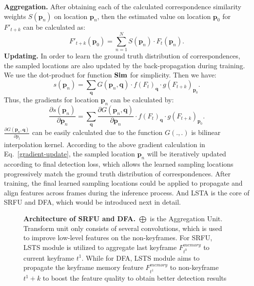 \documentclass[runningheads]{llncs}
\begin{document}
\noindent \textbf{Aggregation.}
After obtaining each of the calculated correspondence similarity weights $S(\mathbf{p}_n)$ on location $\mathbf{p}_n$, then the estimated value on location $\mathbf{p}_0$ for $F'_{t+k}$ can be calculated as:
\begin{equation}
    F'_{t+k}(\mathbf{p}_0) = \sum_{n=1}^{N} S(\mathbf{p}_n) \cdot F_t(\mathbf{p}_n).
\end{equation}
\noindent \textbf{Updating.}
In order to learn the ground truth distribution of correspondences, the sampled locations are also updated by the back-propagation during training.
We use the dot-product for function ${\rm \mathbf{Sim}}$ for simplicity.
Then we have:
\begin{equation}
s(\mathbf{p}_n) = \sum_{\mathbf{q}} G(\mathbf{p}_n,\mathbf{q}) \cdot f(F_{t})_{\mathbf{q}} \cdot g(F_{t+k})_{\mathbf{p}_0}.
\end{equation}
Thus, the gradients for location $\mathbf{p}_n$ can be calculated by:
\begin{equation}
\frac{\partial s(\mathbf{p}_n)}{ \partial \mathbf{p}_n} = \sum_{\mathbf{q}} \frac{\partial G(\mathbf{p}_n, \mathbf{q})}{\partial \mathbf{p}_n} \cdot f(F_{t})_{\mathbf{q}} \cdot g(F_{t+k})_{\mathbf{p}_0}.
\label{gradient-update}
\end{equation}
$\frac{\partial G(\mathbf{p}_n, \mathbf{q})}{\partial p_l}$ can be easily calculated due to the function $G(.,.)$ is bilinear interpolation kernel. 
According to the above gradient calculation in Eq.~\ref{gradient-update}, the sampled location $\mathbf{p}_n$ will be iteratively updated according to final detection loss, which allows the learned sampling locations progressively match the ground truth distribution of correspondences. After training, the final learned sampling locations could be applied to propagate and align features across frames during the inference process. And LSTA is the core of SRFU and DFA, which would be introduced next in detail.

\begin{figure}[t]
\centering
{}\caption{
\textbf{Architecture of SRFU and DFA.} 
$\bigoplus$ is the Aggregation Unit. 
Transform unit only consists of several convolutions, which is used to improve low-level features on the non-keyframes. 
For SRFU, LSTS module is utilized to aggregate last keyframe $F_{t^0}^{memory}$ to current keyframe $t^1$. While for DFA, LSTS module aims to propagate the keyframe memory feature $F_{t^1}^{memory}$ to non-keyframe $t^1+k$ to boost the feature quality to obtain better detection results}
\label{srfu-dfa}
\end{figure}
\end{document}
